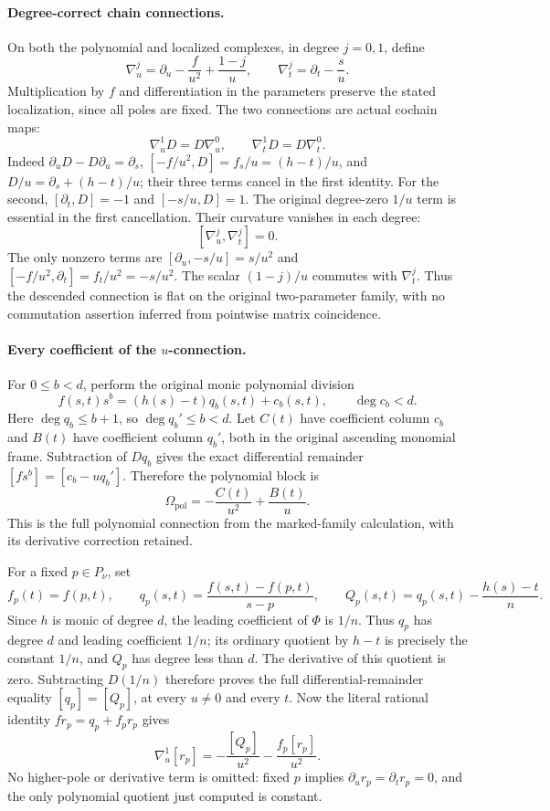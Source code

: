 \paragraph{Degree-correct chain connections.}
On both the polynomial and localized complexes, in degree \(j=0,1\),
define
\[
 \nabla_u^j=\partial_u-\frac{f}{u^2}+\frac{1-j}{u},
 \qquad
 \nabla_t^j=\partial_t-\frac{s}{u}.
 \tag{APU3}
\]
Multiplication by \(f\) and differentiation in the parameters preserve
the stated localization, since all poles are fixed.  The two
connections are actual cochain maps:
\[
 \nabla_u^1D=D\nabla_u^0,\qquad
 \nabla_t^1D=D\nabla_t^0 .
 \tag{APU4}
\]
Indeed \(\partial_u D-D\partial_u=\partial_s\),
\([{-f/u^2},D]=f_s/u=(h-t)/u\), and
\(D/u=\partial_s+(h-t)/u\); their three terms cancel in the first
identity.  For the second,
\([\partial_t,D]=-1\) and \([{-s/u},D]=1\).
The original degree-zero \(1/u\) term is essential in the first
cancellation.
Their curvature vanishes in each degree:
\[
 [\nabla_u^j,\nabla_t^j]=0.
 \tag{APU5}
\]
The only nonzero terms are
\([\partial_u,-s/u]=s/u^2\) and
\([-f/u^2,\partial_t]=f_t/u^2=-s/u^2\).
The scalar \((1-j)/u\) commutes with \(\nabla_t^j\).
Thus the descended connection is flat on the original
two-parameter family, with no commutation assertion inferred from
pointwise matrix coincidence.

\paragraph{Every coefficient of the \(u\)-connection.}
For \(0\leq b<d\), perform the original monic polynomial division
\[
 f(s,t)s^b=(h(s)-t)q_b(s,t)+c_b(s,t),\qquad \deg c_b<d.
\]
Here \(\deg q_b\leq b+1\), so \(\deg q_b'\leq b<d\).
Let \(C(t)\) have coefficient column \(c_b\) and \(B(t)\) have
coefficient column \(q_b'\), both in the original ascending monomial
frame.  Subtraction of \(Dq_b\) gives the exact differential remainder
\([fs^b]=[c_b-uq_b']\).  Therefore the polynomial block is
\[
 \Omega_{\mathrm{pol}}
       =-\frac{C(t)}{u^2}+\frac{B(t)}u .
 \tag{APU6}
\]
This is the full polynomial connection from the marked-family
calculation, with its derivative correction retained.

For a fixed \(p\in P_\nu\), set
\[
 f_p(t)=f(p,t),\qquad
 q_p(s,t)=\frac{f(s,t)-f(p,t)}{s-p},\qquad
 Q_p(s,t)=q_p(s,t)-\frac{h(s)-t}{n}.
 \tag{APU7}
\]
Since \(h\) is monic of degree \(d\), the leading coefficient of
\(\Phi\) is \(1/n\).  Thus \(q_p\) has degree \(d\) and leading
coefficient \(1/n\); its ordinary quotient by \(h-t\) is precisely
the constant \(1/n\), and \(Q_p\) has degree less than \(d\).
The derivative of this quotient is zero.  Subtracting \(D(1/n)\)
therefore proves the full differential-remainder equality
\([q_p]=[Q_p]\), at every \(u\ne0\) and every \(t\).
Now the literal rational identity
\(fr_p=q_p+f_pr_p\) gives
\[
 \nabla_u^1[r_p]
     =-\frac{[Q_p]}{u^2}-\frac{f_p[r_p]}{u^2}.
 \tag{APU8}
\]
No higher-pole or derivative term is omitted: fixed \(p\) implies
\(\partial_u r_p=\partial_t r_p=0\), and the only polynomial
quotient just computed is constant.

